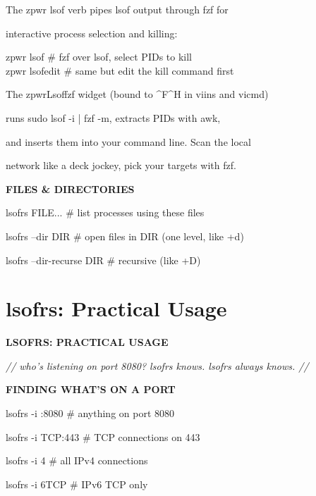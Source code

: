 \documentclass[11pt,a4paper,twoside]{book}
\begin{document}
The zpwr lsof verb pipes lsof output through fzf for

interactive process selection and killing:

\begin{codebox}
zpwr lsof           \# fzf over lsof, select PIDs to kill\\
zpwr lsofedit       \# same but edit the kill command first\\
\end{codebox}

The zpwrLsoffzf widget (bound to \textasciicircum{}F\textasciicircum{}H in viins and vicmd)

runs sudo lsof -i | fzf -m, extracts PIDs with awk,

and inserts them into your command line. Scan the local

network like a deck jockey, pick your targets with fzf.


\vspace{12pt}
{\bfseries\color{neonyellow} FILES \& DIRECTORIES}\vspace{4pt}

lsofrs FILE...      \# list processes using these files

lsofrs --dir DIR    \# open files in DIR (one level, like +d)

lsofrs --dir-recurse DIR \# recursive (like +D)


\vspace{16pt}

\section{lsofrs: Practical Usage}


\vspace{10pt}
{\large\bfseries\color{neoncyan} LSOFRS: PRACTICAL USAGE}\vspace{6pt}

{\small\itshape\color{dimtext} // who's listening on port 8080? lsofrs knows. lsofrs always knows. //}


\vspace{12pt}
{\bfseries\color{neonyellow} FINDING WHAT'S ON A PORT}\vspace{4pt}

lsofrs -i :8080        \# anything on port 8080

lsofrs -i TCP:443      \# TCP connections on 443

lsofrs -i 4            \# all IPv4 connections

lsofrs -i 6TCP         \# IPv6 TCP only
\end{document}
